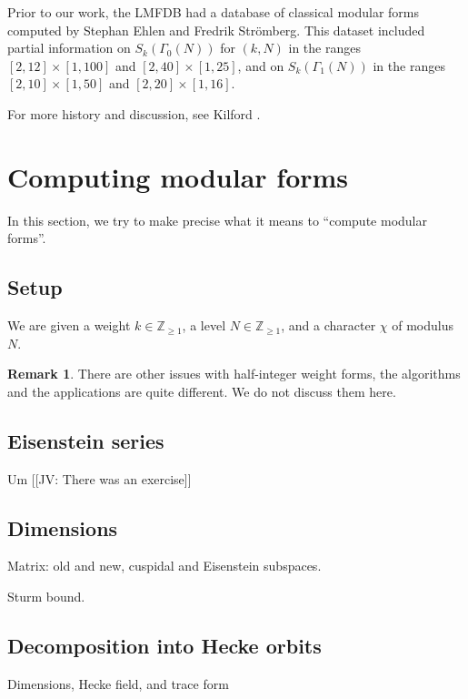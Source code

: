 \documentclass[11pt]{amsart}
\numberwithin{equation}{subsection}
\theoremstyle{plain}
\theoremstyle{definition}
\newtheorem{rmk}[equation]{Remark}
\newcommand{\Z}{\mathbb{Z}}
\newcommand{\jv}[1]{{\color{red} \textsf{[[JV: #1]]}}}
\begin{document}
Prior to our work, the LMFDB had a database of classical modular forms computed by Stephan Ehlen and Fredrik Str\"omberg.  This dataset included partial information on $S_k(\Gamma_0(N))$ for $(k,N)$ in the ranges $[2,12] \times [1,100]$ and $[2,40] \times [1,25]$, and on $S_k(\Gamma_1(N))$ in the ranges $[2,10] \times [1,50]$ and $[2,20] \times [1,16]$.  

For more history and discussion, see Kilford \cite[Chapter 7]{Kilford}.

\section{Computing modular forms}

In this section, we try to make precise what it means to ``compute modular forms''.  

\subsection{Setup}

We are given a weight $k \in \Z_{\geq 1}$, a level $N \in \Z_{\geq 1}$, and a character $\chi$ of modulus $N$.  

\begin{rmk}
There are other issues with half-integer weight forms, the algorithms and the applications are quite different.  We do not discuss them here.
\end{rmk}

\subsection{Eisenstein series}

Um \jv{There was an exercise}

\subsection{Dimensions}

Matrix: old and new, cuspidal and Eisenstein subspaces.

Sturm bound.

\subsection{Decomposition into Hecke orbits}

Dimensions, Hecke field, and trace form
\end{document}
